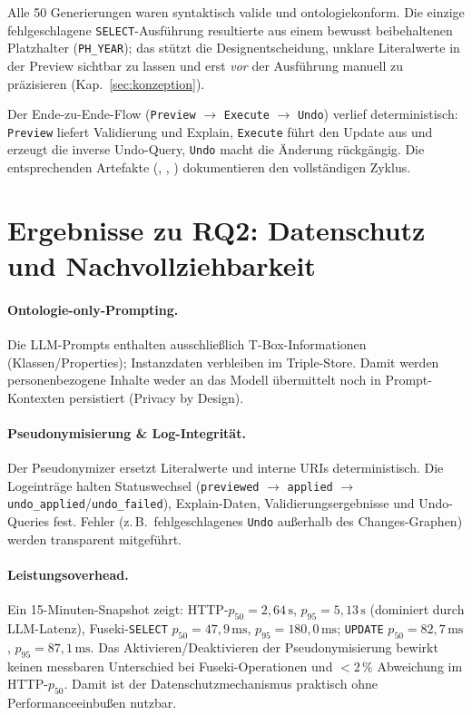 Alle 50 Generierungen waren syntaktisch valide und ontologiekonform. Die einzige fehlgeschlagene \texttt{SELECT}-Ausführung resultierte aus einem bewusst beibehaltenen Platzhalter (\texttt{PH\_YEAR}); das stützt die Designentscheidung, unklare Literalwerte in der Preview sichtbar zu lassen und erst \emph{vor} der Ausführung manuell zu präzisieren (Kap.~\ref{sec:konzeption}).

Der Ende-zu-Ende-Flow (\texttt{Preview} $\rightarrow$ \texttt{Execute} $\rightarrow$ \texttt{Undo}) verlief deterministisch: \texttt{Preview} liefert Validierung und Explain, \texttt{Execute} führt den Update aus und erzeugt die inverse Undo-Query, \texttt{Undo} macht die Änderung rückgängig. Die entsprechenden Artefakte (, , ) dokumentieren den vollständigen Zyklus.

\section{Ergebnisse zu RQ2: Datenschutz und Nachvollziehbarkeit}
\label{sec:ergebnisse-rq2}

\paragraph{Ontologie-only-Prompting.}
Die LLM-Prompts enthalten ausschließlich T-Box-Informationen (Klassen/Properties); Instanzdaten verbleiben im Triple-Store. Damit werden personenbezogene Inhalte weder an das Modell übermittelt noch in Prompt-Kontexten persistiert (Privacy by Design).

\paragraph{Pseudonymisierung \& Log-Integrität.}
Der Pseudonymizer ersetzt Literalwerte und interne URIs deterministisch. Die Logeinträge halten Statuswechsel (\texttt{previewed} \(\rightarrow\) \texttt{applied} \(\rightarrow\) \texttt{undo\_applied}/\texttt{undo\_failed}), Explain-Daten, Validierungsergebnisse und Undo-Queries fest. Fehler (z.\,B.\ fehlgeschlagenes \texttt{Undo} außerhalb des Changes-Graphen) werden transparent mitgeführt.

\paragraph{Leistungsoverhead.}
Ein 15-Minuten-Snapshot zeigt: HTTP-\(p_{50}=2{,}64\,\mathrm{s}\), \(p_{95}=5{,}13\,\mathrm{s}\) (dominiert durch LLM-Latenz), Fuseki-\texttt{SELECT} \(p_{50}=47{,}9\,\mathrm{ms}\), \(p_{95}=180{,}0\,\mathrm{ms}\); \texttt{UPDATE} \(p_{50}=82{,}7\,\mathrm{ms}\), \(p_{95}=87{,}1\,\mathrm{ms}\). Das Aktivieren/Deaktivieren der Pseudonymisierung bewirkt keinen messbaren Unterschied bei Fuseki-Operationen und $<2\,\%$ Abweichung im HTTP-\(p_{50}\). Damit ist der Datenschutzmechanismus praktisch ohne Performanceeinbußen nutzbar.


